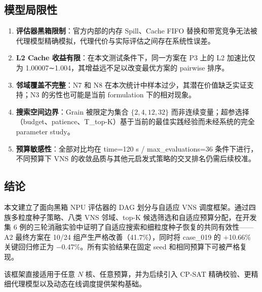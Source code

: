 \documentclass[bwprint]{gmcmthesis}
\begin{document}
\subsection{模型局限性}

\begin{enumerate}
  \item \textbf{评估器黑箱限制}：官方内部的内存 Spill、Cache FIFO 替换和带宽竞争无法被代理模型精确模拟，代理代价与实际评估之间存在系统性误差。
  \item \textbf{L2 Cache 收益有限}：在本文测试条件下，同一方案在 P3 上的 L2 加速比仅为 1.00007∼1.004，其增益远不足以改变最优方案的 pairwise 排序。
  \item \textbf{邻域覆盖不完整}：N7 和 N8 在本次统计中样本过少，其潜在价值缺乏实证支持；N3 的劣性也可能是当前 formulation 下的相对现象。
  \item \textbf{搜索空间边界}：Grain 被限定为集合 $\{2,4,12,32\}$ 而非连续变量；超参选择（budget、patience、T\_top-K）基于当前的最佳实践经验而未经系统的完全 parameter study。
  \item \textbf{预算敏感性}：全部对比均在 time=120 s / max\_evaluations=36 条件下进行，不同预算下 VNS 的收敛品质与其他元启发式策略的交叉排名仍需后续校准。
\end{enumerate}

\subsection{结论}

本文建立了面向黑箱 NPU 评估器的 DAG 划分与自适应 VNS 调度框架。通过四族多粒度种子策略、八类 VNS 邻域、top-K 候选筛选和自适应预算分配，在开发集 6 例的三轮消融实验中证明了自适应搜索和细粒度种子恢复的共同有效性——A2 最终方案在 10/24 组产生严格改善（41.7\%），同时将 case\_019 的 $+$10.66\% 关键回归修正为 $-$0.47\%。所有实验结果在固定 seed 和相同预算下可被严格复现。

该框架直接适用于任意 $N$ 核、任意预算，并为后续引入 CP-SAT 精确校验、更精细代理模型以及动态在线调度提供架构基础。
\end{document}
